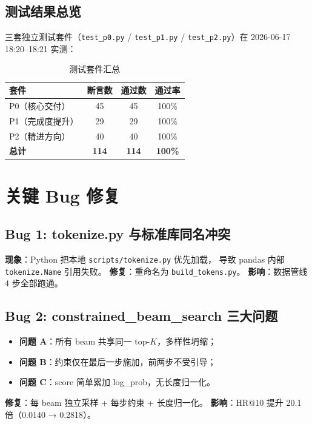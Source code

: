 \documentclass[12pt,a4paper]{article}
\begin{document}
\subsection{测试结果总览}
三套独立测试套件（\texttt{test\_p0.py} / \texttt{test\_p1.py} /
\texttt{test\_p2.py}）在 2026-06-17 18:20--18:21 实测：

\begin{table}[ht]
    \centering
    \begin{tabular}{lccc}
        \toprule
        \textbf{套件} & \textbf{断言数} & \textbf{通过数} & \textbf{通过率} \\
        \midrule
        P0（核心交付）       & 45 & 45 & 100\% \\
        P1（完成度提升）     & 29 & 29 & 100\% \\
        P2（精进方向）       & 40 & 40 & 100\% \\
        \midrule
        \textbf{总计}        & \textbf{114} & \textbf{114} & \textbf{100\%} \\
        \bottomrule
    \end{tabular}
    \caption{测试套件汇总}
\end{table}

\section{关键 Bug 修复}

\subsection{Bug 1: tokenize.py 与标准库同名冲突}
\textbf{现象}：Python 把本地 \texttt{scripts/tokenize.py} 优先加载，
导致 pandas 内部 \texttt{tokenize.Name} 引用失败。
\textbf{修复}：重命名为 \texttt{build\_tokens.py}。
\textbf{影响}：数据管线 4 步全部跑通。

\subsection{Bug 2: constrained\_beam\_search 三大问题}
\begin{itemize}[leftmargin=2em]
    \item \textbf{问题 A}：所有 beam 共享同一 top-$K$，多样性坍缩；
    \item \textbf{问题 B}：约束仅在最后一步施加，前两步不受引导；
    \item \textbf{问题 C}：score 简单累加 log\_prob，无长度归一化。
\end{itemize}
\textbf{修复}：每 beam 独立采样 + 每步约束 + 长度归一化。
\textbf{影响}：HR@10 提升 20.1 倍（0.0140 → 0.2818）。
\end{document}
